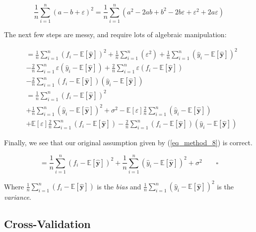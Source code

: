 \documentclass[a4paper,10pt,english]{article}
\begin{document}
\begin{multicols*}{2}
\begin{equation*}
\frac{1}{n} \sum_{i=1}^{n} (a - b + \varepsilon )^2
= \frac{1}{n} \sum_{i=1}^{n} ( a^2 - 2ab + b^2 - 2b\varepsilon + \varepsilon^2 + 2a\varepsilon )
\end{equation*}

The next few steps are messy, and require lots of algebraic manipulation:	

\begin{align*}	
&= \frac{1}{n} \sum_{i=1}^{n} ( f_i - \mathbb{E}[\hat{\mathbf{y}}] )^2 
+ \frac{1}{n} \sum_{i=1}^{n} ( \varepsilon^2 )
+ \frac{1}{n} \sum_{i=1}^{n} ( \hat{y}_i - \mathbb{E}[\hat{\mathbf{y}}] )^2 
\\&- \frac{2}{n} \sum_{i=1}^{n} \varepsilon ( \hat{y}_i - \mathbb{E}[\hat{\mathbf{y}}] )
+ \frac{2}{n} \sum_{i=1}^{n} \varepsilon ( f_i - \mathbb{E}[\hat{\mathbf{y}}] )
\\&- \frac{2}{n} \sum_{i=1}^{n} ( f_i - \mathbb{E}[\hat{\mathbf{y}}] ) ( \hat{y}_i - \mathbb{E}[\hat{\mathbf{y}}] )
\\&= \frac{1}{n} \sum_{i=1}^{n} ( f_i - \mathbb{E}[\hat{\mathbf{y}}] )^2 
\\&+ \frac{1}{n} \sum_{i=1}^{n} ( \hat{y}_i - \mathbb{E}[\hat{\mathbf{y}}] )^2 
+ \sigma^2
- \mathbb{E}[\varepsilon] \frac{2}{n} \sum_{i=1}^{n} ( \hat{y}_i - \mathbb{E}[\hat{\mathbf{y}}] )
\\&+ \mathbb{E}[\varepsilon] \frac{2}{n} \sum_{i=1}^{n} ( f_i - \mathbb{E}[\hat{\mathbf{y}}] )
-\frac{2}{n} \sum_{i=1}^{n} ( f_i - \mathbb{E}[\hat{\mathbf{y}}] ) ( \hat{y}_i - \mathbb{E}[\hat{\mathbf{y}}] )
\end{align*}

Finally, we see that our original assumption given by (\ref{eq_method_8}) is correct.

\begin{equation*}
= \frac{1}{n} \sum_{i=1}^{n} ( f_i - \mathbb{E}[\hat{\mathbf{y}}] )^2 
+ \frac{1}{n} \sum_{i=1}^{n} ( \hat{y}_i - \mathbb{E}[\hat{\mathbf{y}}] )^2 
+ \sigma^2 \qquad \square
\end{equation*}

Where $\frac{1}{n} \sum_{i=1}^{n} ( f_i - \mathbb{E}[\hat{\mathbf{y}}] )$ is the \textit{bias} and
$\frac{1}{n} \sum_{i=1}^{n} ( \hat{y}_i - \mathbb{E}[\hat{\mathbf{y}}] )^2$ is the \textit{variance}.	

\subsection*{Cross-Validation}


\end{multicols*}
\end{document}
